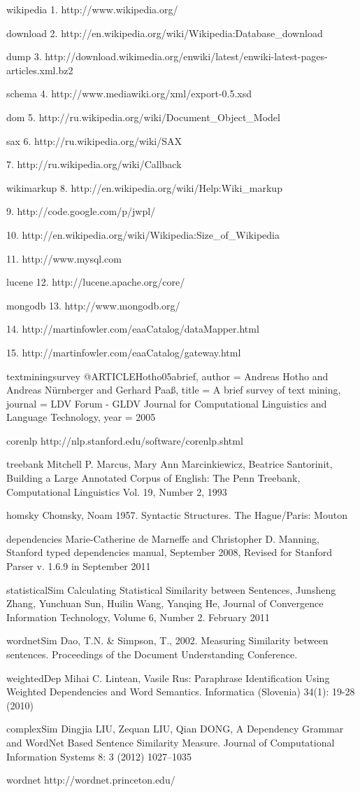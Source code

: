 
wikipedia
1. http://www.wikipedia.org/

download
2. http://en.wikipedia.org/wiki/Wikipedia:Database_download

dump
3. http://download.wikimedia.org/enwiki/latest/enwiki-latest-pages-articles.xml.bz2

schema
4. http://www.mediawiki.org/xml/export-0.5.xsd

dom
5. http://ru.wikipedia.org/wiki/Document_Object_Model

sax
6. http://ru.wikipedia.org/wiki/SAX

7. http://ru.wikipedia.org/wiki/Callback

wikimarkup
8. http://en.wikipedia.org/wiki/Help:Wiki_markup

9. http://code.google.com/p/jwpl/

10. http://en.wikipedia.org/wiki/Wikipedia:Size_of_Wikipedia

11. http://www.mysql.com

lucene
12. http://lucene.apache.org/core/

mongodb
13. http://www.mongodb.org/

14. http://martinfowler.com/eaaCatalog/dataMapper.html

15. http://martinfowler.com/eaaCatalog/gateway.html

textminingsurvey
@ARTICLE{Hotho05abrief,
    author = {Andreas Hotho and Andreas Nürnberger and Gerhard Paaß},
    title = {A brief survey of text mining},
    journal = {LDV Forum - GLDV Journal for Computational Linguistics and Language Technology},
    year = {2005}
}

corenlp
http://nlp.stanford.edu/software/corenlp.shtml

treebank
Mitchell  P. Marcus, Mary Ann Marcinkiewicz, Beatrice Santorinit, Building a Large Annotated Corpus of English: The Penn Treebank, Computational Linguistics Vol. 19, Number 2, 1993

homsky
Chomsky, Noam 1957. Syntactic Structures. The Hague/Paris: Mouton

dependencies
Marie-Catherine de Marneffe and Christopher D. Manning, Stanford typed dependencies manual, September 2008, Revised for Stanford Parser v. 1.6.9 in September 2011

statisticalSim
Calculating Statistical Similarity between Sentences, Junsheng Zhang, Yunchuan Sun, Huilin Wang, Yanqing He, Journal of Convergence Information Technology, Volume 6, Number 2. February 2011

wordnetSim
Dao, T.N. & Simpson, T., 2002. Measuring Similarity between sentences. Proceedings of the Document Understanding Conference. 

weightedDep
Mihai C. Lintean, Vasile Rus: Paraphrase Identification Using Weighted Dependencies and Word Semantics. Informatica (Slovenia) 34(1): 19-28 (2010)

complexSim
Dingjia LIU, Zequan LIU, Qian DONG, A Dependency Grammar and WordNet Based Sentence Similarity Measure. Journal of Computational Information Systems 8: 3 (2012) 1027–1035

wordnet
http://wordnet.princeton.edu/
